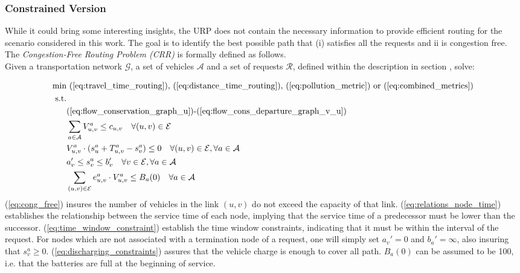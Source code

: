 \subsubsection*{Constrained Version}
While it could bring some interesting insights, the URP does not contain the necessary information to provide efficient routing for the scenario considered in this work. The goal is to identify the best possible path that \textup{(i)} satisfies all the requests and \textup{ii} is congestion free. The \textit{Congestion-Free Routing Problem (CRR)} is formally defined as follows.\\ Given a transportation network $\mathcal{G}$, a set of vehicles $\mathcal{A}$ and a set of requests $\mathcal{R}$, defined within the description in section , solve:

\begin{align}
	\text{min}&  \text{
		(\ref{eq:travel_time_routing}), (\ref{eq:distance_time_routing}), (\ref{eq:pollution_metric}) or (\ref{eq:combined_metrics})
	}\nonumber\\
	\text{s.t.} &\nonumber\\
	&\text{(\ref{eq:flow_conservation_graph_u})-(\ref{eq:flow_cons_departure_graph_v_u})}\nonumber\\
	&\sum_{a \in \mathcal{A}}V^a_{u,v} \leq c_{u,v} \quad \forall (u,v) \in \mathcal{E} \label{eq:cong_free}\\
	&V^a_{u,v}\cdot(s_{u}^a + T_{u,v}^a - s_{v}^a) \leq 0 \quad \forall (u,v) \in \mathcal{E}, \forall a \in \mathcal{A}\label{eq:relations_node_time}\\
	&a'_v \leq s_{v}^a \leq b'_v \quad \forall v \in \mathcal{E}, \forall a \in \mathcal{A}\label{eq:time_window_constraint}\\
	&\sum_{(u,v) \in \mathcal{E}}e^a_{u,v}\cdot V^a_{u,v} \leq B_a(0)\quad \forall a \in \mathcal{A} \label{eq:discharging_constraints}
\end{align} 
(\ref{eq:cong_free}) insures the number of vehicles in the link $(u,v)$ do not exceed the capacity of that link. (\ref{eq:relations_node_time}) establishes the relationship between the service time of each node, implying that the service time of a predecessor must be lower than the successor.  (\ref{eq:time_window_constraint}) establish the time window constraints, indicating that it must be within the interval of the request. For nodes which are not associated with a termination node of a  request, one will simply set $a_v' = 0 $ and $b_a' = \infty$, also insuring that $s_v^a \ge 0 $. (\ref{eq:discharging_constraints}) assures that the vehicle charge is enough to cover all path. $B_a(0)$ can be assumed to be 100, i.e. that the batteries are full at the beginning of service. \\
